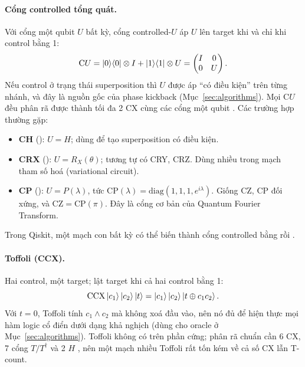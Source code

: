 \paragraph{Cổng controlled tổng quát.} Với cổng một qubit $U$ bất kỳ, cổng controlled-$U$ áp $U$
lên target khi và chỉ khi control bằng 1:
\begin{equation}
  \mathrm{C}U = \ket{0}\!\bra{0}\otimes I + \ket{1}\!\bra{1}\otimes U =
  \begin{pmatrix} I & 0 \\ 0 & U \end{pmatrix}.
\end{equation}
Nếu control ở trạng thái superposition thì $U$ được áp ``có điều kiện'' trên từng nhánh, và đây là
nguồn gốc của phase kickback (Mục~\ref{sec:algorithms}). Mọi C$U$ đều phân rã được thành tối đa
2 CX cùng các cổng một qubit \cite{barenco1995}. Các trường hợp thường gặp:
\begin{itemize}[noitemsep]
  \item \textbf{CH} (): $U = H$; dùng để tạo superposition có điều kiện.
  \item \textbf{CRX} (): $U = R_X(\theta)$; tương tự có CRY, CRZ. Dùng
    nhiều trong mạch tham số hoá (variational circuit).
  \item \textbf{CP} (): $U = P(\lambda)$, tức
    $\mathrm{CP}(\lambda) = \mathrm{diag}(1,1,1,e^{i\lambda})$. Giống CZ, CP đối xứng, và
    $\mathrm{CZ} = \mathrm{CP}(\pi)$. Đây là cổng cơ bản của Quantum Fourier Transform.
\end{itemize}
Trong Qiskit, một mạch con bất kỳ có thể biến thành cổng controlled bằng
 rồi .

\paragraph{Toffoli (CCX).} Hai control, một target; lật target khi cả hai control bằng 1:
\begin{equation}
  \mathrm{CCX}\ket{c_1}\ket{c_2}\ket{t} = \ket{c_1}\ket{c_2}\ket{t \oplus c_1c_2}.
\end{equation}
Với $t=0$, Toffoli tính $c_1 \wedge c_2$ mà không xoá đầu vào, nên nó đủ để hiện thực mọi hàm logic
cổ điển dưới dạng khả nghịch (dùng cho oracle ở Mục~\ref{sec:algorithms}). Toffoli không có trên
phần cứng; phân rã chuẩn cần 6 CX, 7 cổng $T/T^\dagger$ và 2 $H$ \cite{nielsen2010}, nên một mạch
nhiều Toffoli rất tốn kém về cả số CX lẫn T-count.

